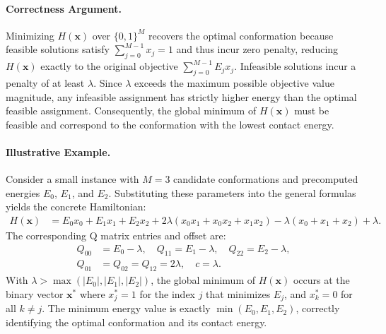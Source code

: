\documentclass[12pt]{article}
\begin{document}
\paragraph{Correctness Argument.}
Minimizing $H(\mathbf{x})$ over $\{0,1\}^M$ recovers the optimal conformation because feasible solutions satisfy $\sum_{j=0}^{M-1} x_j = 1$ and thus incur zero penalty, reducing $H(\mathbf{x})$ exactly to the original objective $\sum_{j=0}^{M-1} E_j x_j$. Infeasible solutions incur a penalty of at least $\lambda$. Since $\lambda$ exceeds the maximum possible objective value magnitude, any infeasible assignment has strictly higher energy than the optimal feasible assignment. Consequently, the global minimum of $H(\mathbf{x})$ must be feasible and correspond to the conformation with the lowest contact energy.

\paragraph{Illustrative Example.}
Consider a small instance with $M=3$ candidate conformations and precomputed energies $E_0$, $E_1$, and $E_2$. Substituting these parameters into the general formulas yields the concrete Hamiltonian:
\begin{align}
H(\mathbf{x}) &= E_0 x_0 + E_1 x_1 + E_2 x_2 + 2\lambda(x_0 x_1 + x_0 x_2 + x_1 x_2) - \lambda(x_0 + x_1 + x_2) + \lambda.
\end{align}
The corresponding Q matrix entries and offset are:
\begin{align}
Q_{00} &= E_0 - \lambda, \quad Q_{11} = E_1 - \lambda, \quad Q_{22} = E_2 - \lambda, \\
Q_{01} &= Q_{02} = Q_{12} = 2\lambda, \quad c = \lambda.
\end{align}
With $\lambda > \max(|E_0|, |E_1|, |E_2|)$, the global minimum of $H(\mathbf{x})$ occurs at the binary vector $\mathbf{x}^*$ where $x_j^* = 1$ for the index $j$ that minimizes $E_j$, and $x_k^* = 0$ for all $k \neq j$. The minimum energy value is exactly $\min(E_0, E_1, E_2)$, correctly identifying the optimal conformation and its contact energy.
\end{document}
